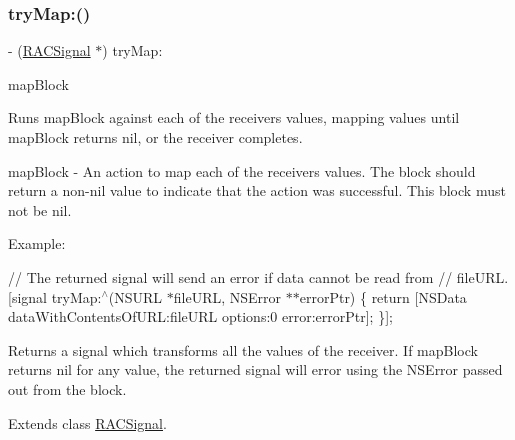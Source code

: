 \mbox{\label{category_r_a_c_signal_07_operations_08_a282c8989886b5b9a75e4ecb298221b58}} 
\subsubsection{\texorpdfstring{try\+Map\+:()}{tryMap:()}\hspace{0.1cm}{\footnotesize\ttfamily [1/3]}}
{\footnotesize\ttfamily -\/ (\mbox{\hyperlink{interface_r_a_c_signal}{R\+A\+C\+Signal}} $\ast$) try\+Map\+: \begin{DoxyParamCaption}\item[{(id($^\wedge$)(id value, N\+S\+Error $\ast$$\ast$error\+Ptr))}]{map\+Block }\end{DoxyParamCaption}}

Runs {\ttfamily map\+Block} against each of the receiver\textquotesingle{}s values, mapping values until {\ttfamily map\+Block} returns nil, or the receiver completes.

map\+Block -\/ An action to map each of the receiver\textquotesingle{}s values. The block should return a non-\/nil value to indicate that the action was successful. This block must not be nil.

Example\+:

// The returned signal will send an error if data cannot be read from // {\ttfamily file\+U\+RL}. \mbox{[}signal try\+Map\+:$^\wedge$(N\+S\+U\+RL $\ast$file\+U\+RL, N\+S\+Error $\ast$$\ast$error\+Ptr) \{ return \mbox{[}N\+S\+Data data\+With\+Contents\+Of\+U\+RL\+:file\+U\+RL options\+:0 error\+:error\+Ptr\mbox{]}; \}\mbox{]};

Returns a signal which transforms all the values of the receiver. If {\ttfamily map\+Block} returns nil for any value, the returned signal will error using the {\ttfamily N\+S\+Error} passed out from the block. 

Extends class \mbox{\hyperlink{interface_r_a_c_signal_a282c8989886b5b9a75e4ecb298221b58}{R\+A\+C\+Signal}}.

\mbox{\label{category_r_a_c_signal_07_operations_08_a282c8989886b5b9a75e4ecb298221b58}} 
